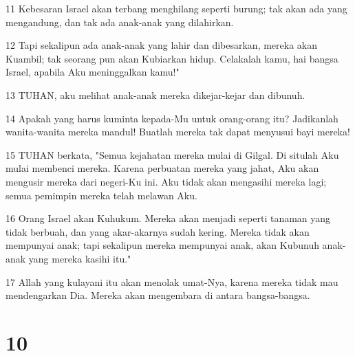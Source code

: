\par 11 Kebesaran Israel akan terbang menghilang seperti burung; tak akan ada yang mengandung, dan tak ada anak-anak yang dilahirkan.
\par 12 Tapi sekalipun ada anak-anak yang lahir dan dibesarkan, mereka akan Kuambil; tak seorang pun akan Kubiarkan hidup. Celakalah kamu, hai bangsa Israel, apabila Aku meninggalkan kamu!"
\par 13 TUHAN, aku melihat anak-anak mereka dikejar-kejar dan dibunuh.
\par 14 Apakah yang harus kuminta kepada-Mu untuk orang-orang itu? Jadikanlah wanita-wanita mereka mandul! Buatlah mereka tak dapat menyusui bayi mereka!
\par 15 TUHAN berkata, "Semua kejahatan mereka mulai di Gilgal. Di situlah Aku mulai membenci mereka. Karena perbuatan mereka yang jahat, Aku akan mengusir mereka dari negeri-Ku ini. Aku tidak akan mengasihi mereka lagi; semua pemimpin mereka telah melawan Aku.
\par 16 Orang Israel akan Kuhukum. Mereka akan menjadi seperti tanaman yang tidak berbuah, dan yang akar-akarnya sudah kering. Mereka tidak akan mempunyai anak; tapi sekalipun mereka mempunyai anak, akan Kubunuh anak-anak yang mereka kasihi itu."
\par 17 Allah yang kulayani itu akan menolak umat-Nya, karena mereka tidak mau mendengarkan Dia. Mereka akan mengembara di antara bangsa-bangsa.

\chapter{10}


